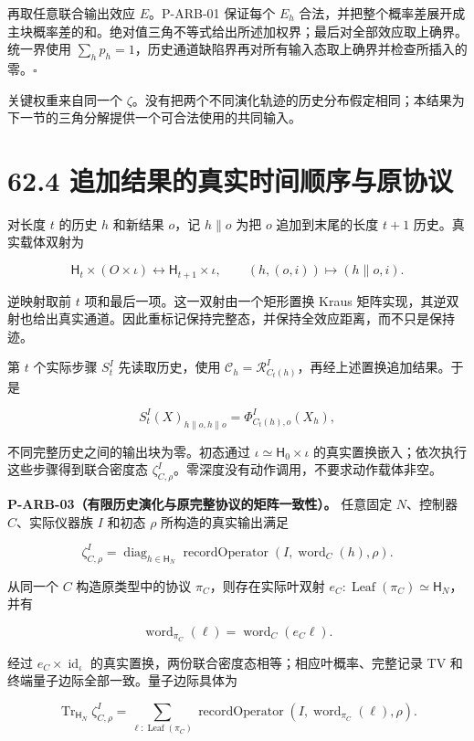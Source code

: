 \documentclass[
  11pt,
  oneside]{book}
\begin{document}
再取任意联合输出效应 \(E\)。P-ARB-01 保证每个 \(E_h\)
合法，并把整个概率差展开成主块概率差的和。绝对值三角不等式给出所述加权界；最后对全部效应取上确界。统一界使用
\(\sum_hp_h=1\)，历史通道缺陷界再对所有输入态取上确界并检查所插入的零。\(\square\)

关键权重来自同一个
\(\zeta\)。没有把两个不同演化轨迹的历史分布假定相同；本结果为下一节的三角分解提供一个可合法使用的共同输入。

\section{62.4 追加结果的真实时间顺序与原协议}

对长度 \(t\) 的历史 \(h\) 和新结果 \(o\)，记 \(h\mathbin{\|}o\) 为把
\(o\) 追加到末尾的长度 \(t+1\) 历史。真实载体双射为

\[
\mathsf H_t\times(O\times\iota)
\longleftrightarrow\mathsf H_{t+1}\times\iota,
\qquad(h,(o,i))\longmapsto(h\mathbin{\|}o,i).
\]

逆映射取前 \(t\) 项和最后一项。这一双射由一个矩形置换 Kraus
矩阵实现，其逆双射也给出真实通道。因此重标记保持完整态，并保持全效应距离，而不只是保持迹。

第 \(t\) 个实际步骤 \(S^I_t\) 先读取历史，使用
\(\mathcal C_h=\mathcal R^I_{C_t(h)}\)，再经上述置换追加结果。于是

\[
S^I_t(X)_{h\|o,h\|o}
=\Phi^I_{C_t(h),o}(X_h),
\]

不同完整历史之间的输出块为零。初态通过
\(\iota\simeq\mathsf H_0\times\iota\)
的真实置换嵌入；依次执行这些步骤得到联合密度态
\(\zeta^I_{C,\rho}\)。零深度没有动作调用，不要求动作载体非空。

\protect\hypertarget{p-arb-03}{}{}

\textbf{P-ARB-03（有限历史演化与原完整协议的矩阵一致性）。} 任意固定
\(N\)、控制器 \(C\)、实际仪器族 \(I\) 和初态 \(\rho\)
所构造的真实输出满足

\[
\zeta^I_{C,\rho}
=\operatorname{diag}_{h\in\mathsf H_N}
 \operatorname{recordOperator}(I,\operatorname{word}_C(h),\rho).
\]

从同一个 \(C\) 构造原类型中的协议 \(\pi_C\)，则存在实际叶双射
\(e_C:\operatorname{Leaf}(\pi_C)\simeq\mathsf H_N\)，并有

\[
\operatorname{word}_{\pi_C}(\ell)
=\operatorname{word}_C(e_C\ell).
\]

经过 \(e_C\times\operatorname{id}_\iota\)
的真实置换，两份联合密度态相等；相应叶概率、完整记录 TV
和终端量子边际全部一致。量子边际具体为

\[
\operatorname{Tr}_{\mathsf H_N}\zeta^I_{C,\rho}
=\sum_{\ell:\operatorname{Leaf}(\pi_C)}
 \operatorname{recordOperator}(I,\operatorname{word}_{\pi_C}(\ell),\rho).
\]
\end{document}
